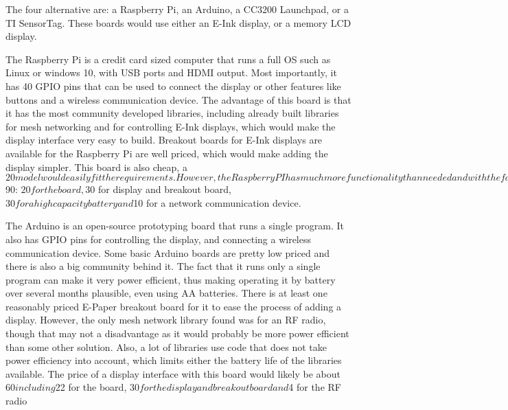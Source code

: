 \documentclass[ppfs.tex]{template/subfiles}
\begin{document}
The four alternative are: a Raspberry Pi, an Arduino, a CC3200 Launchpad, or a TI SensorTag. These boards would use either an E-Ink display, or a memory LCD display.

The Raspberry Pi is a credit card sized computer that runs a full OS such as Linux or windows 10, with USB ports and HDMI output. Most importantly, it has 40 GPIO pins that can be used to connect the display or other features like buttons and a wireless communication device.
The advantage of this board is that it has the most community developed libraries, including already built libraries for mesh networking and for controlling E-Ink displays, which would make the display interface very easy to build. Breakout boards for E-Ink displays are available for the Raspberry Pi are well priced, which would make adding the display simpler. This board is also cheap, a $20 model would easily fit the requirements.
However, the Raspberry PI has much more functionality than needed and with the fact that it is running an OS, it uses much more power than any of the other options, making it virtually impossible to run off battery. There are some batteries that might work for a few days, but they are expensive and rather large for this board. Along with the fact that it is not an open source board, the complexity of the Raspberry Pi would make it hard to go from one to an actual product.
The price of a display interface with this board would likely be about $90: $20 for the board, $30 for display and breakout board, $30 for a high capacity battery and $10 for a network communication device.

The Arduino is an open-source prototyping board that runs a single program. It also has GPIO pins for controlling the display, and connecting a wireless communication device.
Some basic Arduino boards are pretty low priced and there is also a big community behind it. The fact that it runs only a single program can make it very power efficient, thus making operating it by battery over several months plausible, even using AA batteries. There is at least one reasonably priced E-Paper breakout board for it to ease the process of adding a display. 
However, the only mesh network library found was for an RF radio, though that may not a disadvantage as it would probably be more power efficient than some other solution. Also, a lot of libraries use code that does not take power efficiency into account, which limits either the battery life of the libraries available.
The price of a display interface with this board would likely be about $60 including $22 for the board, $30 for the display and breakout board and $4 for the RF radio
\end{document}
